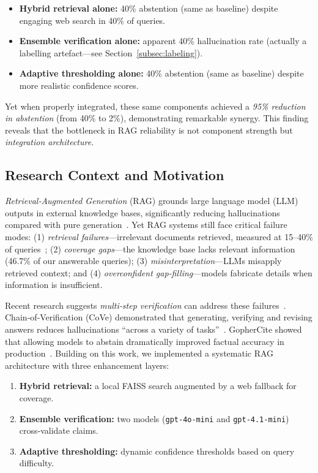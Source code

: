 \documentclass{article}
\begin{document}
\begin{itemize}
    \item \textbf{Hybrid retrieval alone:} 40\% abstention (same as baseline) despite engaging web search in 40\% of queries.
    \item \textbf{Ensemble verification alone:} apparent 40\% hallucination rate (actually a labelling artefact—see Section~\ref{subsec:labeling}).
    \item \textbf{Adaptive thresholding alone:} 40\% abstention (same as baseline) despite more realistic confidence scores.
\end{itemize}

Yet when properly integrated, these same components achieved a \emph{95\% reduction in abstention} (from 40\% to 2\%), demonstrating remarkable synergy. This finding reveals that the bottleneck in RAG reliability is not component strength but \emph{integration architecture}.

\subsection{Research Context and Motivation}

\emph{Retrieval‑Augmented Generation} (RAG) grounds large language model (LLM) outputs in external knowledge bases, significantly reducing hallucinations compared with pure generation~\cite{lewis2020rag,shuster2021retaug,gao2023ragsurvey}. Yet RAG systems still face critical failure modes: (1) \emph{retrieval failures}—irrelevant documents retrieved, measured at 15–40\% of queries~\cite{gao2023ragsurvey}; (2) \emph{coverage gaps}—the knowledge base lacks relevant information (46.7\% of our answerable queries); (3) \emph{misinterpretation}—LLMs misapply retrieved context; and (4) \emph{overconfident gap‑filling}—models fabricate details when information is insufficient.

Recent research suggests \emph{multi‑step verification} can address these failures~\cite{dhuliawala2024cove,he2024covrag,cobbe2021verifiers}. Chain‑of‑Verification (CoVe) demonstrated that generating, verifying and revising answers reduces hallucinations “across a variety of tasks”~\cite{dhuliawala2024cove}. GopherCite showed that allowing models to abstain dramatically improved factual accuracy in production~\cite{menick2022gophercite}. Building on this work, we implemented a systematic RAG architecture with three enhancement layers:

\begin{enumerate}
    \item \textbf{Hybrid retrieval:} a local FAISS search augmented by a web fallback for coverage.
    \item \textbf{Ensemble verification:} two models (\texttt{gpt‑4o‑mini} and \texttt{gpt‑4.1‑mini}) cross‑validate claims.
    \item \textbf{Adaptive thresholding:} dynamic confidence thresholds based on query difficulty.
\end{enumerate}
\end{document}

